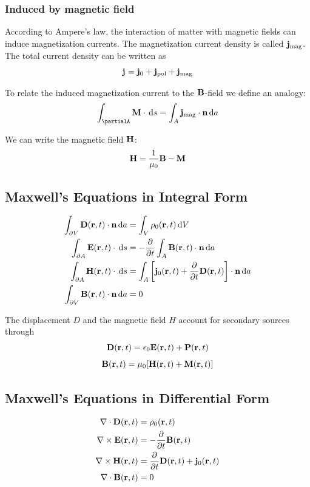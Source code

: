 \documentclass[a4paper, fontsize=8pt, landscape, DIV=1]{scrartcl}
\begin{document}
\begin{multicols*}{4}
  \subsubsection{Induced by magnetic field}
  According to Ampere's law, the interaction of matter with magnetic fields can induce magnetization currents. The magnetization current density is called $\mathbf{j}_\text{mag}$. The total current density can be written as
  \[\mathbf{j}_\text{} = \mathbf{j}_\text{0} + \mathbf{j}_\text{pol} + \mathbf{j}_\text{mag}\]

  To relate the induced magnetization current to the $\mathbf{B}$-field we define an analogy:
  \[\int_{\partialA}\mbf{M}\cdot\Dx s= \int_A \mbf{j}_\text{mag}\cdot \mbf{n} \Dx a\]

  We can write the magnetic field $\mathbf{H}$:
  \[\mathbf{H}=\frac{1}{\mu_0}\mathbf{B}-\mathbf{M}\]

  \subsection{Maxwell's Equations in Integral Form}
  \begin{align*}
    \int_{\partial V} \mathbf{D}(\mathbf{r},t) \cdot\mathbf{n}\,\mathrm{d} a &= \int_V \rho_0(\mathbf{r},t) \,\mathrm{d} V \\
    \int_{\partial A} \mathbf{E}(\mathbf{r},t) \cdot \,\mathrm{d} s &= -\frac{\partial}{\partial t}\int_A \mathbf{B}(\mathbf{r},t) \cdot \mathbf{n} \,\mathrm{d} a \\
    \int_{\partial A} \mathbf{H}(\mathbf{r},t) \cdot \,\mathrm{d} s &= \int_A \left[\mathbf{j}_0(\mathbf{r},t) + \frac{\partial}{\partial t}\mathbf{D}(\mathbf{r},t)\right] \cdot \mathbf{n} \,\mathrm{d} a \\
    \int_{\partial V} \mathbf{B}(\mathbf{r},t) \cdot \mathbf{n} \,\mathrm{d} a &= 0
  \end{align*}

  The displacement $D$ and the magnetic field $H$ account for secondary sources through
  \[\mathbf{D}(\mathbf{r},t) = \epsilon_0 \mathbf{E}(\mathbf{r},t)+\mathbf{P}(\mathbf{r},t)\]
  \[ \mathbf{B}(\mathbf{r},t) = \mu_0 [\mathbf{H}(\mathbf{r},t) + \mathbf{M}(\mathbf{r},t)]\]

  \subsection{Maxwell's Equations in Differential Form}
  \begin{align*}
    \nabla \cdot \mathbf{D}(\mathbf{r},t) &= \rho_0(\mathbf{r},t) \\
    \nabla\times \mathbf{E}(\mathbf{r},t) &= -\frac{\partial}{\partial t}\mathbf{B}(\mathbf{r},t) \\
    \nabla\times \mathbf{H}(\mathbf{r},t) &= \frac{\partial}{\partial t}\mathbf{D}(\mathbf{r},t) + \mathbf{j}_0(\mathbf{r},t)\\
    \nabla \cdot \mathbf{B}(\mathbf{r},t) &= 0
  \end{align*}


\end{multicols*}
\end{document}
